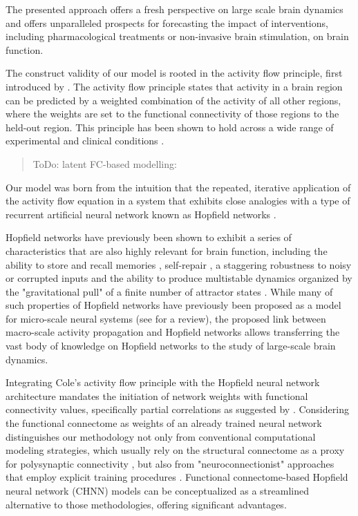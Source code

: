 \documentclass{article}
\begin{document}
The presented approach offers a fresh perspective on large scale brain dynamics and offers unparalleled prospects for forecasting the impact of interventions, including pharmacological treatments or non-invasive brain stimulation, on brain function.

The construct validity of our model is rooted in the activity flow principle, first introduced by
\citet{cole2016activity}. The activity flow principle states that activity in a brain region can be predicted by a weighted combination of the activity of all other regions, where the weights are set to the functional connectivity of those regions to the held-out region. This principle has been shown to hold across a wide range of experimental and clinical conditions
\citep{cole2016activity, ito2017cognitive, mill2022network, hearne2021activity, chen2018human}.

\begin{quote}
ToDo: latent FC-based modelling: \cite{McCormick_2022}
\end{quote}

Our model was born from the intuition that the repeated, iterative application of the activity flow equation in a system that exhibits close analogies with a type of recurrent artificial neural network known as Hopfield networks
\citep{hopfield1982neural}.

Hopfield networks have previously been shown to exhibit a series of characteristics that are also highly relevant for
brain function, including the ability to store and recall memories \citep{hopfield1982neural}, self-repair \citep{murre2003selfreparing},
a staggering robustness to noisy or corrupted inputs \citep{hertz1991introduction} and the ability to produce
multistable dynamics organized by the "gravitational pull" of a finite number of attractor states
\citep{khona2022attractor}. While many of such properties of Hopfield networks have previously been proposed as a model for micro-scale neural systems (see \cite{khona2022attractor} for a review), the proposed link between macro-scale activity propagation and Hopfield networks allows transferring the vast body of knowledge on Hopfield networks to the study of large-scale brain dynamics.

Integrating Cole's activity flow principle with the Hopfield neural network architecture mandates the initiation of network weights with functional connectivity values, specifically partial correlations as suggested by \citet{cole2016activity}.
Considering the functional connectome as weights of an already trained neural network distinguishes our methodology not only from conventional computational modeling strategies, which usually rely on the structural connectome as a proxy for polysynaptic connectivity \citep{cabral2017functional}, but also from "neuroconnectionist" approaches that employ explicit training procedures \citep{doerig2023neuroconnectionist}.
Functional connectome-based Hopfield neural network (CHNN) models can be conceptualized as a streamlined alternative to those methodologies, offering significant advantages.
\end{document}
